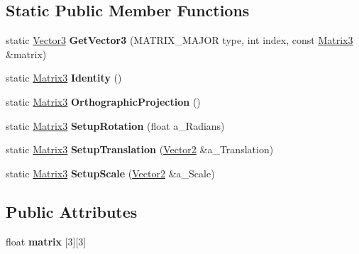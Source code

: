 \subsection*{Static Public Member Functions}
\begin{DoxyCompactItemize}
\item 
\hypertarget{class_ai_math_1_1_matrix3_a084dd6672ff56d16eeffe4fdb6f5adfa}{static \hyperlink{class_ai_math_1_1_vector3}{Vector3} {\bfseries Get\+Vector3} (M\+A\+T\+R\+I\+X\+\_\+\+M\+A\+J\+O\+R type, int index, const \hyperlink{class_ai_math_1_1_matrix3}{Matrix3} \&matrix)}\label{class_ai_math_1_1_matrix3_a084dd6672ff56d16eeffe4fdb6f5adfa}

\item 
\hypertarget{class_ai_math_1_1_matrix3_ac148b01436f7665fcd90d1d30af9db39}{static \hyperlink{class_ai_math_1_1_matrix3}{Matrix3} {\bfseries Identity} ()}\label{class_ai_math_1_1_matrix3_ac148b01436f7665fcd90d1d30af9db39}

\item 
\hypertarget{class_ai_math_1_1_matrix3_a7c199b205dcab166ac51a2cef8a6001b}{static \hyperlink{class_ai_math_1_1_matrix3}{Matrix3} {\bfseries Orthographic\+Projection} ()}\label{class_ai_math_1_1_matrix3_a7c199b205dcab166ac51a2cef8a6001b}

\item 
\hypertarget{class_ai_math_1_1_matrix3_a9536cf6c042ed7b6d4d1cab2612c030d}{static \hyperlink{class_ai_math_1_1_matrix3}{Matrix3} {\bfseries Setup\+Rotation} (float a\+\_\+\+Radians)}\label{class_ai_math_1_1_matrix3_a9536cf6c042ed7b6d4d1cab2612c030d}

\item 
\hypertarget{class_ai_math_1_1_matrix3_a81c8db6ec6da6781d87f484913335c0c}{static \hyperlink{class_ai_math_1_1_matrix3}{Matrix3} {\bfseries Setup\+Translation} (\hyperlink{class_ai_math_1_1_vector2}{Vector2} \&a\+\_\+\+Translation)}\label{class_ai_math_1_1_matrix3_a81c8db6ec6da6781d87f484913335c0c}

\item 
\hypertarget{class_ai_math_1_1_matrix3_a806139ef7116069b734eaeb94c3e748c}{static \hyperlink{class_ai_math_1_1_matrix3}{Matrix3} {\bfseries Setup\+Scale} (\hyperlink{class_ai_math_1_1_vector2}{Vector2} \&a\+\_\+\+Scale)}\label{class_ai_math_1_1_matrix3_a806139ef7116069b734eaeb94c3e748c}

\end{DoxyCompactItemize}
\subsection*{Public Attributes}
\begin{DoxyCompactItemize}
\item 
\hypertarget{class_ai_math_1_1_matrix3_a5d6e620ce763ce3a0baf590ac6606f35}{float {\bfseries matrix} \mbox{[}3\mbox{]}\mbox{[}3\mbox{]}}\label{class_ai_math_1_1_matrix3_a5d6e620ce763ce3a0baf590ac6606f35}

\end{DoxyCompactItemize}
